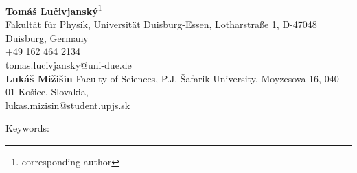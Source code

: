 \documentclass[12pt]{article}
\begin{document}
 {\bf Tom\'a\v{s} Lu\v{c}ivjansk\'y}\footnote{corresponding author}\\
Fakult\"at f\"ur Physik, Universit\"at Duisburg-Essen, 
Lotharstraße 1,
D-47048 Duisburg, Germany \\
+49 162 464 2134\\
tomas.lucivjansky@uni-due.de\\

{\bf Luk\'a\v{s} Mi\v{z}i\v{s}in }
Faculty of Sciences, P.J. \v{S}afarik
University, Moyzesova 16, 040 01 Ko\v{s}ice, Slovakia,\\
lukas.mizisin@student.upjs.sk

\newpage
\begin{abstract}

\end{abstract}
Keywords: 
\newpage
  \begin{abstract}
\end{abstract}
\end{document}
